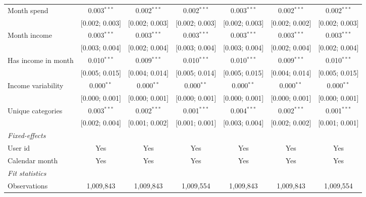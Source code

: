 \begin{table}[htbp]
\begin{threeparttable}[b]
\begin{tabular}{lcccccc}
         Month spend                    & 0.003$^{***}$  & 0.002$^{***}$  & 0.002$^{***}$  & 0.003$^{***}$   & 0.002$^{***}$   & 0.002$^{***}$\\   
                                        & [0.002; 0.003] & [0.002; 0.003] & [0.002; 0.003] & [0.002; 0.003]  & [0.002; 0.002]  & [0.002; 0.003]\\   
         Month income                   & 0.003$^{***}$  & 0.003$^{***}$  & 0.003$^{***}$  & 0.003$^{***}$   & 0.003$^{***}$   & 0.003$^{***}$\\   
                                        & [0.003; 0.004] & [0.002; 0.004] & [0.003; 0.004] & [0.003; 0.004]  & [0.002; 0.004]  & [0.002; 0.004]\\   
         Has income in month            & 0.010$^{***}$  & 0.009$^{***}$  & 0.010$^{***}$  & 0.010$^{***}$   & 0.009$^{***}$   & 0.010$^{***}$\\   
                                        & [0.005; 0.015] & [0.004; 0.014] & [0.005; 0.014] & [0.005; 0.015]  & [0.004; 0.014]  & [0.005; 0.015]\\   
         Income variability             & 0.000$^{**}$   & 0.000$^{**}$   & 0.000$^{**}$   & 0.000$^{**}$    & 0.000$^{**}$    & 0.000$^{**}$\\   
                                        & [0.000; 0.001] & [0.000; 0.001] & [0.000; 0.001] & [0.000; 0.001]  & [0.000; 0.001]  & [0.000; 0.001]\\   
         Unique categories              & 0.003$^{***}$  & 0.002$^{***}$  & 0.001$^{***}$  & 0.004$^{***}$   & 0.002$^{***}$   & 0.001$^{***}$\\   
                                        & [0.002; 0.004] & [0.001; 0.002] & [0.001; 0.001] & [0.003; 0.004]  & [0.002; 0.002]  & [0.001; 0.001]\\   
         \midrule
         \emph{Fixed-effects}\\
         User id                        & Yes            & Yes            & Yes            & Yes             & Yes             & Yes\\  
         Calendar month                 & Yes            & Yes            & Yes            & Yes             & Yes             & Yes\\  
         \midrule
         \emph{Fit statistics}\\
         Observations                   & 1,009,843      & 1,009,843      & 1,009,554      & 1,009,843       & 1,009,843       & 1,009,554\\  

\end{tabular}
\end{threeparttable}
\end{table}
